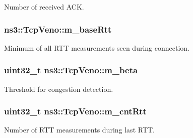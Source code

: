 Number of received A\+CK. 

\subsubsection[{\texorpdfstring{m\+\_\+base\+Rtt}{m_baseRtt}}]{ ns3\+::\+Tcp\+Veno\+::m\+\_\+base\+Rtt\hspace{0.3cm}{\ttfamily [private]}}\hypertarget{classns3_1_1TcpVeno_aeae3dd21752b2d7dd774202fe8a6d5e1}{}\label{classns3_1_1TcpVeno_aeae3dd21752b2d7dd774202fe8a6d5e1}


Minimum of all R\+TT measurements seen during connection. 

\subsubsection[{\texorpdfstring{m\+\_\+beta}{m_beta}}]{\setlength{\rightskip}{0pt plus 5cm}uint32\+\_\+t ns3\+::\+Tcp\+Veno\+::m\+\_\+beta\hspace{0.3cm}{\ttfamily [private]}}\hypertarget{classns3_1_1TcpVeno_ad041620f3dc6988923c412d8a4183f36}{}\label{classns3_1_1TcpVeno_ad041620f3dc6988923c412d8a4183f36}


Threshold for congestion detection. 

\subsubsection[{\texorpdfstring{m\+\_\+cnt\+Rtt}{m_cntRtt}}]{\setlength{\rightskip}{0pt plus 5cm}uint32\+\_\+t ns3\+::\+Tcp\+Veno\+::m\+\_\+cnt\+Rtt\hspace{0.3cm}{\ttfamily [private]}}\hypertarget{classns3_1_1TcpVeno_a56ba63c2e02200d19b808741c1f68c64}{}\label{classns3_1_1TcpVeno_a56ba63c2e02200d19b808741c1f68c64}


Number of R\+TT measurements during last R\+TT. 

